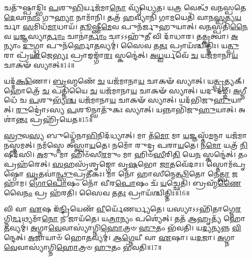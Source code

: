 𑌚𑌤𑍁᳴𑌷𑍍𑌪𑌾𑌦𑍍𑌭𑌿𑌃 \ul{𑌪}\-𑌶𑍁\-\ul{𑌭𑌿}\-𑌰𑍍𑌯𑌜᳴𑌮𑌾\-\ul{𑌨𑍋} 𑌵𑍍𑌯𑍃᳴𑌧𑍍𑌯𑍇𑌤।
𑌯\-\ul{𑌤𑍍𑌰} 𑌵𑍇𑌤𑍍𑌥᳴ 𑌵𑌨𑌸𑍍𑌪𑌤𑍇 \ul{𑌦𑍇}\-𑌵𑌾\-\ul{𑌨𑌾𑌂} 𑌗𑍁\-\ul{𑌹𑍍𑌯𑌾} 𑌨𑌾𑌮𑌾᳴𑌨𑌿।
𑌤𑌤𑍍𑌰᳴ \ul{𑌹}\-𑌵𑍍𑌯𑌾𑌨𑌿᳴ 𑌗𑌾\-\ul{𑌮}\-𑌯𑍇𑌤𑌿᳴ 𑌵𑌾𑌨\-\ul{𑌸𑍍𑌪}\-𑌤𑍍𑌯\-\ul{𑌯}\-𑌰𑍍𑌚𑌾 \ul{𑌸}\-𑌮𑌿𑌧᳴\-\ul{𑌮𑌾}\-𑌧𑌾𑌯᳴।
\-\ul{𑌤𑍂}\-𑌷𑍍𑌣𑍀\-\ul{𑌮𑍇}\-𑌵 𑌪𑍁𑌨᳴𑌰𑍍𑌜𑍁𑌹𑍁𑌯𑌾𑌤𑍍।
𑌵\-\ul{𑌨}\-𑌸𑍍𑌪𑌤𑌿᳴\-\ul{𑌨𑍈}\-𑌵 \ul{𑌯}\-𑌜𑍍𑌞𑌸𑍍𑌯𑌾\-\ul{𑌰𑍍𑌤𑌾𑌂} 𑌚𑌾𑌨𑌾॑\-\ul{𑌰𑍍𑌤𑌾𑌂} 𑌚𑌾𑌽𑌽𑌹𑍁᳴\-\ul{𑌤𑍀} 𑌵𑌿 𑌦𑌾᳴𑌧𑌾𑌰।
𑌤\-\ul{𑌤𑍍𑌕𑍃}\-𑌤𑍍𑌵𑌾।
\-\ul{𑌅}\-𑌨𑍍𑌯𑌾𑌂 \ul{𑌦𑍁}\-𑌗𑍍𑌧𑍍𑌵𑌾 𑌪𑍁𑌨᳴𑌰𑍍\mbox{}𑌹𑍋\-\ul{𑌤}\-𑌵𑍍𑌯𑌮𑍍॑।
𑌸𑍈𑌵 𑌤\-\ul{𑌤𑌃} 𑌪𑍍𑌰𑌾𑌯᳴𑌶𑍍𑌚𑌿𑌤𑍍𑌤𑌿𑌃।
𑌯\-\ul{𑌤𑍍𑌪𑍁}\-𑌰𑌾 𑌪𑍍𑌰᳴\-\ul{𑌯𑌾}\-𑌜𑍇\-\ul{𑌭𑍍𑌯𑌃} 𑌪𑍍𑌰𑌾𑌙𑌙𑍍𑌗𑌾᳴\-\ul{𑌰𑌃} 𑌸𑍍𑌕𑌨𑍍𑌦𑍇॑𑌤𑍍।
\-\ul{𑌅}\-\-\ul{𑌧𑍍𑌵}\-𑌰𑍍𑌯𑌵𑍇᳴ \ul{𑌚} 𑌯𑌜᳴𑌮𑌾𑌨𑌾\-\ul{𑌯} 𑌚𑌾𑌕𑍟᳴ 𑌸𑍍𑌯𑌾𑌤𑍍॥14॥

𑌯𑌦𑍍𑌦᳴\-\ul{𑌕𑍍𑌷𑌿}\-𑌣𑌾।
\-\ul{𑌬𑍍𑌰}\-𑌹𑍍𑌮𑌣𑍇᳴ \ul{𑌚} 𑌯𑌜᳴𑌮𑌾𑌨𑌾\-\ul{𑌯} 𑌚𑌾𑌕𑍟᳴ 𑌸𑍍𑌯𑌾𑌤𑍍।
𑌯\-\ul{𑌤𑍍𑌪𑍍𑌰}\-𑌤𑍍𑌯𑌕𑍍।
𑌹𑍋𑌤𑍍𑌰𑍇᳴ \ul{𑌚} 𑌪𑌤𑍍𑌨𑌿᳴𑌯𑍈 \ul{𑌚} 𑌯𑌜᳴𑌮𑌾𑌨𑌾\-\ul{𑌯} 𑌚𑌾𑌕𑍟᳴ 𑌸𑍍𑌯𑌾𑌤𑍍।
𑌯𑌦𑍁𑌦𑌙𑍍𑌙𑍍᳴।
\-\ul{𑌅}\-𑌗𑍍𑌨𑍀𑌧𑍇᳴ 𑌚 \ul{𑌪}\-𑌶𑍁𑌭𑍍𑌯᳴\-\ul{𑌶𑍍𑌚} 𑌯𑌜᳴𑌮𑌾𑌨𑌾\-\ul{𑌯} 𑌚𑌾𑌕𑍟᳴ 𑌸𑍍𑌯𑌾𑌤𑍍।
𑌯𑌦᳴𑌭𑌿𑌜𑍁\-\ul{𑌹𑍁}\-𑌯𑌾𑌤𑍍।
\-\ul{𑌰𑍁}\-𑌦𑍍𑌰𑍋॑𑌽𑌸𑍍𑌯 \ul{𑌪}\-𑌶𑍂𑌨𑍍𑌘𑌾𑌤𑍁᳴𑌕𑌃 𑌸𑍍𑌯𑌾𑌤𑍍।
𑌯𑌨𑍍𑌨𑌾𑌭𑌿᳴𑌜𑍁\-\ul{𑌹𑍁}\-𑌯𑌾𑌤𑍍।
𑌅𑌶𑌾॑\-\ul{𑌨𑍍𑌤𑌃} 𑌪𑍍𑌰𑌹𑍍𑌰𑌿᳴𑌯𑍇𑌤॥15॥

\-\ul{𑌸𑍍𑌰𑍁}\-𑌵\-\ul{𑌸𑍍𑌯} 𑌬𑍁𑌧𑍍𑌨𑍇᳴𑌨𑌾\-\ul{𑌭𑌿}\-𑌨𑌿𑌦᳴𑌧𑍍𑌯𑌾𑌤𑍍।
𑌮𑌾 𑌤᳴\-\ul{𑌮𑍋} 𑌮𑌾 \ul{𑌯}\-𑌜𑍍𑌞𑌸𑍍𑌤᳴\-\ul{𑌮}\-𑌨𑍍𑌮𑌾 𑌯𑌜᳴𑌮𑌾𑌨𑌸𑍍𑌤𑌮𑌤𑍍।
𑌨𑌮᳴𑌸𑍍𑌤𑍇 𑌅𑌸𑍍𑌤𑍍𑌵𑌾\-\ul{𑌯}\-𑌤𑍇।
𑌨𑌮𑍋᳴ 𑌰𑍁𑌦𑍍𑌰 𑌪𑌰𑌾\-\ul{𑌯}\-𑌤𑍇।
𑌨\-\ul{𑌮𑍋} 𑌯𑌤𑍍𑌰᳴ \ul{𑌨𑌿}\-𑌷𑍀𑌦᳴𑌸𑌿।
\-\ul{𑌅}\-𑌮𑍁𑌂 𑌮𑌾 𑌹𑌿𑍞᳴𑌸𑍀\-\ul{𑌰}\-𑌮𑍁𑌂 𑌮𑌾 𑌹𑌿𑍞᳴\-\ul{𑌸𑍀}\-𑌰𑌿\-\ul{𑌤𑌿} 𑌯𑍇\-\ul{𑌨} 𑌸𑍍𑌕𑌨𑍍𑌦𑍇॑𑌤𑍍।
𑌤𑌂 𑌪𑍍𑌰𑌹᳴𑌰𑍇𑌤𑍍।
\-\ul{𑌸}\-𑌹𑌸𑍍𑌰᳴𑌶𑍃𑌙𑍍𑌗𑍋 𑌵𑍃\-\ul{𑌷}\-𑌭𑍋 \ul{𑌜𑌾}\-𑌤𑌵𑍇᳴𑌦𑌾𑌃।
𑌸𑍍𑌤𑍋𑌮᳴𑌪𑍃𑌷𑍍𑌠𑍋 \ul{𑌘𑍃}\-𑌤𑌵𑌾॑\-\ul{𑌨𑍍𑌥𑍍𑌸𑍁}\-𑌪𑍍𑌰𑌤𑍀᳴𑌕𑌃।
𑌮𑌾 𑌨𑍋᳴ 𑌹𑌾𑌸𑍀𑌨𑍍𑌮𑍇\-\ul{𑌤𑍍𑌥𑌿}\-𑌤𑍋 𑌨𑍇\-\ul{𑌤𑍍𑌤𑍍𑌵𑌾} 𑌜𑌹𑌾᳴𑌮।
\-\ul{𑌗𑍋}\-\-\ul{𑌪𑍋}\-𑌷𑌂 𑌨𑍋᳴ 𑌵𑍀𑌰\-\ul{𑌪𑍋}\-𑌷𑌂 𑌚᳴ \ul{𑌯}\-𑌚𑍍𑌛𑍇𑌤𑌿᳴।
𑌬𑍍𑌰𑌹𑍍𑌮᳴\-\ul{𑌣𑍈}\-𑌵𑍈\-\ul{𑌨𑌂} 𑌪𑍍𑌰 𑌹᳴𑌰𑌤𑌿।
𑌸𑍈𑌵 𑌤\-\ul{𑌤𑌃} 𑌪𑍍𑌰𑌾𑌯᳴𑌶𑍍𑌚𑌿𑌤𑍍𑌤𑌿𑌃॥16॥

𑌵𑌿 𑌵𑌾 \ul{𑌏}\-𑌷 𑌇᳴\-\ul{𑌨𑍍𑌦𑍍𑌰𑌿}\-𑌯𑍇𑌣᳴ \ul{𑌵𑍀}\-𑌰𑍍𑌯𑍇᳴𑌣𑌰𑍍𑌧𑍍𑌯𑌤𑍇।
𑌯𑌸𑍍𑌯𑌾𑌽𑌽𑌹𑌿᳴𑌤𑌾𑌗𑍍𑌨𑍇\-\-\ul{𑌰}\-𑌗𑍍𑌨𑌿\-\ul{𑌰𑍍𑌮}\-𑌥𑍍𑌯\-𑌮𑌾᳴\-\ul{𑌨𑍋} 𑌨 𑌜𑌾𑌯᳴𑌤𑍇।
𑌯\-\ul{𑌤𑍍𑌰𑌾}\-𑌨𑍍𑌯𑌂 𑌪𑌶𑍍𑌯𑍇॑𑌤𑍍।
𑌤𑌤᳴ \ul{𑌆}\-𑌹𑍃𑌤𑍍𑌯᳴ 𑌹𑍋\-\ul{𑌤}\-𑌵𑍍𑌯𑌮𑍍॑।
\-\ul{𑌅}\-𑌗𑍍𑌨𑌾\-\ul{𑌵𑍇}\-𑌵𑌾𑌸𑍍𑌯𑌾॑𑌗𑍍𑌨𑌿\-\ul{𑌹𑍋}\-𑌤𑍍𑌰𑍞 \ul{𑌹𑍁}\-𑌤𑌂 𑌭᳴𑌵𑌤𑌿।
𑌯\-\ul{𑌦𑍍𑌯}\-𑌨𑍍𑌯𑌨𑍍𑌨 \ul{𑌵𑌿}\-𑌨𑍍𑌦𑍇𑌤𑍍।
\-\ul{𑌅}\-𑌜𑌾𑌯𑌾𑍞᳴ 𑌹𑍋\-\ul{𑌤}\-𑌵𑍍𑌯𑌮𑍍॑।
\-\ul{𑌆}\-\-\ul{𑌗𑍍𑌨𑍇}\-𑌯𑍀 𑌵𑌾 \ul{𑌏}\-𑌷𑌾।
𑌯\-\ul{𑌦}\-𑌜𑌾।
\-\ul{𑌅}\-𑌗𑍍𑌨𑌾\-\ul{𑌵𑍇}\-𑌵𑌾𑌸𑍍𑌯𑌾॑𑌗𑍍𑌨𑌿\-\ul{𑌹𑍋}\-𑌤𑍍𑌰𑍞 \ul{𑌹𑍁}\-𑌤𑌂 𑌭᳴𑌵𑌤𑌿॥17॥

